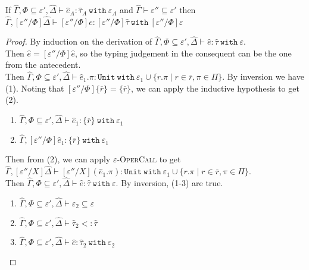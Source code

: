 \documentclass{llncs}
\newcommand{\keywadj}[1]{\mathtt{#1}}
\newcommand{\keyw}[1]{\keywadj{#1}~}
\newcommand{\kw}[1]{\keyw{ #1 }}
\newcommand{\kwa}[1]{\keywadj{ #1 }}
\newcommand{\Unit}[0]{ \kwa{Unit} }
\begin{document}
\hrulefill

\begin{lemma}
If $\hat \Gamma, \Phi \subseteq \varepsilon', \hat \Delta \vdash \hat e_A: \hat \tau_A~\kw{with} \varepsilon_A$ and $\hat \Gamma \vdash \varepsilon'' \subseteq \varepsilon'$ then $\hat \Gamma, [\varepsilon''/\Phi]\hat \Delta \vdash [\varepsilon''/\Phi]e: [\varepsilon''/\Phi]\hat \tau~\kw{with} [\varepsilon''/\Phi]\varepsilon$
\end{lemma}

\begin{proof} By induction on the derivation of $\hat \Gamma, \Phi \subseteq \varepsilon', \hat \Delta \vdash \hat e: \hat \tau~\kw{with} \varepsilon$.\\

 Then $\hat e = [\varepsilon''/\Phi]\hat e$, so the typing judgement in the consequent can be the one from the antecedent. \\

 Then $\hat \Gamma, \Phi \subseteq \varepsilon', \hat \Delta \vdash \hat e_1.\pi : \Unit~\kw{with} \varepsilon_1 \cup \{ r.\pi \mid r \in \overline{r}, \pi \in \Pi \}$. By inversion we have (1). Noting that $[\varepsilon''/\Phi]\{\overline{r}\} = \{ \overline{r} \}$, we can apply the inductive hypothesis to get (2).

\begin{enumerate}
	\item $\hat \Gamma, \Phi \subseteq \varepsilon', \hat \Delta \vdash \hat e_1: \{ \overline{r} \} ~\kw{with} \varepsilon_1$
	\item $\hat \Gamma, [\varepsilon''/\Phi]\hat e_1: \{ \overline{r} \}~\kw{with} \varepsilon_1$
\end{enumerate}

Then from (2), we can apply \textsc{$\varepsilon$-OperCall} to get $\hat \Gamma, [\varepsilon''/X]\hat \Delta \vdash [\varepsilon''/X](\hat e_1.\pi): \Unit~\kw{with} \varepsilon_1 \cup \{ r.\pi \mid r \in \overline{r}, \pi \in \Pi \}$.\\

 Then $\hat \Gamma, \Phi \subseteq \varepsilon', \hat \Delta \vdash \hat e: \hat \tau~\kw{with} \varepsilon$. By inversion, (1-3) are true.

\begin{enumerate}
	\item $\hat \Gamma, \Phi \subseteq \varepsilon', \hat \Delta \vdash \varepsilon_2 \subseteq \varepsilon$
	\item $\hat \Gamma, \Phi \subseteq \varepsilon', \hat \Delta \vdash 
\hat \tau_2 <: \hat \tau$
	\item $\hat \Gamma, \Phi \subseteq \varepsilon', \hat \Delta \vdash \hat e: \hat \tau_2~\kw{with} \varepsilon_2$
\end{enumerate}


\end{proof}
\end{document}

